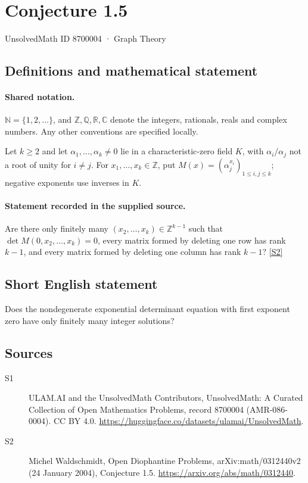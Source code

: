 \documentclass[11pt]{article}
\newcommand{\sref}[2]{\hyperlink{source:#1:#2}{[S#2]}}
\begin{document}
\setcounter{section}{8700003}
\section{Conjecture 1.5}\label{8700004}
{\small\sffamily UnsolvedMath ID 8700004 · Graph Theory}
\subsection{Definitions and mathematical statement}

\paragraph{Shared notation.}$\mathbb N=\{1,2,\ldots\}$, and $\mathbb Z,\mathbb Q,\mathbb R,\mathbb C$ denote the integers, rationals, reals and complex numbers. Any other conventions are specified locally.


Let $k\ge2$ and let $\alpha_1,\ldots,\alpha_k\ne0$ lie in a characteristic-zero field $K$, with $\alpha_i/\alpha_j$ not a root of unity for $i\ne j$. For $x_1,\ldots,x_k\in\mathbb Z$, put $M(x)=(\alpha_j^{x_i})_{1\le i,j\le k}$; negative exponents use inverses in $K$.
\paragraph{Statement recorded in the supplied source.}
Are there only finitely many $(x_2,\ldots,x_k)\in\mathbb Z^{k-1}$ such that $\det M(0,x_2,\ldots,x_k)=0$, every matrix formed by deleting one row has rank $k-1$, and every matrix formed by deleting one column has rank $k-1$? \sref{8700004}{2}
\subsection{Short English statement}
Does the nondegenerate exponential determinant equation with first exponent zero have only finitely many integer solutions?
\subsection{Sources}
\begin{description}
\item[\hypertarget{source:8700004:1}{S1}] ULAM.AI and the UnsolvedMath Contributors, UnsolvedMath: A Curated Collection of Open Mathematics Problems, record 8700004 (AMR-086-0004). CC BY 4.0. \url{https://huggingface.co/datasets/ulamai/UnsolvedMath}.
\item[\hypertarget{source:8700004:2}{S2}] Michel Waldschmidt, Open Diophantine Problems, arXiv:math/0312440v2 (24 January 2004), Conjecture 1.5. \url{https://arxiv.org/abs/math/0312440}.
\end{description}
\label{end:8700004}
\end{document}
